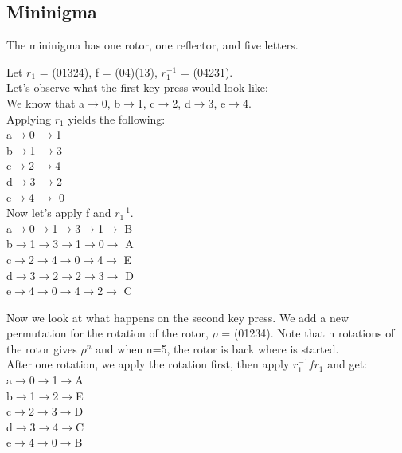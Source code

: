\begin{example}
\section{Mininigma} The mininigma has one rotor, one reflector, and five letters. \begin{example} Let $r_{1}$ = (01324), f = (04)(13),  $r_{1}^{-1}$ = (04231). \\Let's observe what the first key press would look like: \\ We know that 
a$\rightarrow$0, b$\rightarrow$1, c$\rightarrow$2, d$\rightarrow$3, e$\rightarrow$4. \\Applying  $r_{1}$ yields the following: 
\\ a$\rightarrow$0 $\longrightarrow$1 \\ b$\rightarrow$1 $\longrightarrow$3
\\c$\rightarrow$2 $\longrightarrow$4 \\d$\rightarrow$3 $\longrightarrow$2 \\
e$\rightarrow$4 $\longrightarrow$ 0 
\\ Now let's apply f and $r_{1}^{-1}$.
\\a$\rightarrow$0$\longrightarrow$1$\longrightarrow$3$\longrightarrow$1$\rightarrow$ B \\ b$\rightarrow$1$\longrightarrow$3$\longrightarrow$1$\longrightarrow$0$\rightarrow$ A \\c$\rightarrow$2$\longrightarrow$4$\longrightarrow$0$\longrightarrow$4$\rightarrow$ E \\ d$\rightarrow$3$\longrightarrow$2$\longrightarrow$2$\longrightarrow$3$\rightarrow$ D \\e$\rightarrow$4$\longrightarrow$0$\longrightarrow$4$\longrightarrow$2$\rightarrow$ C \end{example}
\begin{example} Now we look at what happens on the second key press. We add a new permutation for the rotation of the rotor, $\rho$ = (01234). Note that n rotations of the rotor gives $\rho ^n$ and when n=5, the rotor is back where is started.
\\ After one rotation, we apply the rotation first, then apply $r_{1}^{-1}f r_{1}$ and get:
\\a$\rightarrow$0$\longrightarrow$1$\longrightarrow$A\\ b$\rightarrow$1$\longrightarrow$2$\longrightarrow$E \\c$\rightarrow$2$\longrightarrow$3$\longrightarrow$D \\ d$\rightarrow$3$\longrightarrow$4$\longrightarrow$C \\e$\rightarrow$4$\longrightarrow$0$\longrightarrow$B

\end{example}
\end{example}
